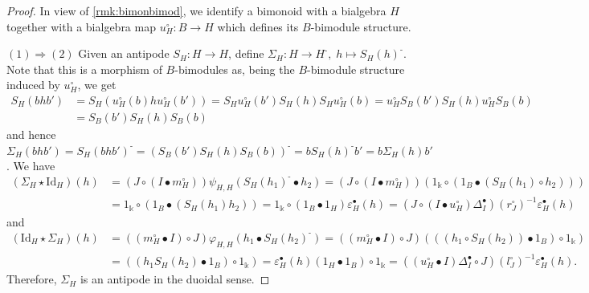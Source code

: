 \documentclass[nosumlimits,twoside]{amsart}
\theoremstyle{definition}
\theoremstyle{remark}
\def\revsn{\text{-}}
\begin{document}
\begin{proof} In view of \cref{rmk:bimonbimod}, we identify a bimonoid with a bialgebra $H$ together with a bialgebra map $u_H^\circ:B\to H$ which defines its $B$-bimodule structure.

$(1)\Rightarrow(2)$ Given an antipode $S_H:H\to H$, define $\Sigma _{H}:H\rightarrow H^{\revsn },\;
h\mapsto S_{H}\left( h\right) ^{\revsn }$. Note that this is a morphism of $B$-bimodules as, being the $B$-bimodule structure induced by $u_H^\circ$, we get
\[
\begin{split}
S_H(bhb')
&=S_H(u_H^\circ(b)hu_H^\circ(b'))
=S_Hu_H^\circ(b')S_H(h)S_Hu_H^\circ(b)
=u_H^\circ S_B(b')S_H(h)u_H^\circ S_B(b)
\\&=S_B(b')S_H(h)S_B(b)
\end{split}
\]
and hence
$\Sigma_H(bhb')=S_H(bhb')^\revsn
=(S_B(b')S_H(h)S_B(b))^\revsn
=bS_H(h)^\revsn b'=b\Sigma_H(h)b'$.
We have%
\begin{equation*}
\begin{split}
\left( \Sigma _{H}\star \mathrm{Id}_{H}\right) \left( h\right) &=\left(
J\circ \left( I\bullet m_{H}^{\circ }\right) \right) \psi _{H,H}\left(
S_{H}\left( h_{1}\right) ^{\revsn }\bullet h_{2}\right) =\left( J\circ \left( I\bullet m_{H}^{\circ }\right) \right) \left(
1_{\Bbbk }\circ \left( 1_{B}\bullet \left( S_{H}\left( h_{1}\right) \circ
h_{2}\right) \right) \right) \\
&=1_{\Bbbk }\circ \left( 1_{B}\bullet \left( S_{H}\left( h_{1}\right)
h_{2}\right) \right) =1_{\Bbbk }\circ \left( 1_{B}\bullet 1_{H}\right)
\varepsilon _{H}^{\bullet }\left( h\right)=(J\circ (I\bullet u_H^\circ)\Delta_I^\bullet)(r^\circ_J)^{-1}\varepsilon^\bullet_H(h)\end{split}
\end{equation*}%
and
\begin{equation*}
\begin{split}
(\mathrm{Id}_{H}\star \Sigma _{H})(h)& =((m_{H}^{\circ }\bullet I)\circ
J)\varphi _{H,H}(h_{1}\bullet S_{H}(h_{2})^{\revsn })  =((m_{H}^{\circ }\bullet I)\circ J)(((h_{1}\circ S_{H}(h_{2}))\bullet
1_{B})\circ 1_{\Bbbk }) \\
& =((h_{1}S_{H}(h_{2})\bullet 1_{B})\circ 1_{\Bbbk })=\varepsilon
_{H}^{\bullet }(h)(1_{H}\bullet 1_{B})\circ 1_{\Bbbk }  =((u_{H}^{\circ }\bullet I)\Delta _{I}^{\bullet }\circ J)(l_{J}^{\circ })^{-1}\varepsilon _{H}^{\bullet }(h).
\end{split}%
\end{equation*}
Therefore, $\Sigma_H$ is an antipode in the duoidal sense.


\end{proof}
\end{document}
